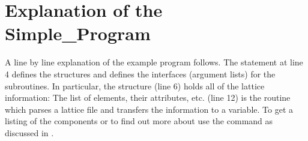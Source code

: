 \section{Explanation of the Simple_Program}

A line by line explanation of the example program follows. 
The  statement at line 4
defines the \bmad structures and defines the interfaces
(argument lists) for the \bmad subroutines. In particular, the
 structure (line 6) holds all of the lattice
information: The list of elements, their attributes,
etc.  (line 12) is the routine which parses a lattice
file and transfers the information to a
 variable. To get a listing of the 
components or to find out more about  use the 
command as discussed in .


